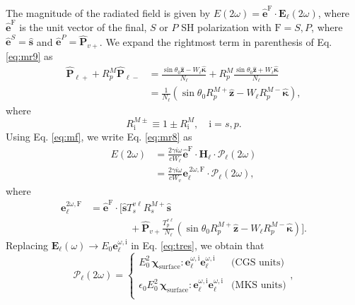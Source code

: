 \documentclass[aps,prb,10pt,showpacs,letterpaper,twocolumn]{revtex4-1}
\begin{document}
The magnitude of the radiated field is given by $E(2\omega) =
\hat{\mathbf{e}}^{\mathrm{F}}\cdot\mathbf{E}_{\ell}(2\omega)$, where
$\hat{\mathbf{e}}^{\mathrm{F}}$ is the unit vector of the final, $S$ or $P$ SH
polarization with $\mathrm{F} = S,P$, where
$\hat{\mathbf{e}}^S=\hat{\mathbf{s}}$ and
$\hat{\mathbf{e}}^P=\hat{\mathbf{P}}_{v+}$. We expand the rightmost term in
parenthesis of Eq. \eqref{eq:mr9} as
\begin{equation*}
\begin{split}
\hat{\mathbf{P}}_{\ell +} + R^{M}_{p}\hat{\mathbf{P}}_{\ell -}
&= \frac{\sin\theta_{0}\hat{\mathbf{z}} - W_{\ell}\hat{\boldsymbol{\kappa}}}
        {N_{\ell}}
 + R^{M}_{p}
   \frac{\sin\theta_{0}\hat{\mathbf{z}} + W_{\ell}\hat{\boldsymbol{\kappa}}}
        {N_{\ell}}\\
&= \frac{1}{N_{\ell}}
\left(
\sin\theta_{0}R^{M+}_{p}\hat{\mathbf{z}}
- W_{\ell}R^{M-}_{p}\hat{\boldsymbol{\kappa}}
\right),
\end{split}
\end{equation*}
where
\begin{equation}\label{eq:rm}
R^{M\pm}_{\mathrm{i}}\equiv 1 \pm R^{M}_{\mathrm{i}}, \quad \mathrm{i}=s,p.
\end{equation}
Using Eq. \eqref{eq:mf}, we write Eq. \eqref{eq:mr8} as
\begin{equation}\label{eq:r10}
\begin{split}
E(2\omega) &= \frac{2\gamma i\omega}{cW_\ell}
\hat{\mathbf{e}}^{\mathrm{F}}\cdot\mathbf{H}_{\ell}\cdot
\boldsymbol{\mathcal{P}}_{\ell}(2\omega)\\
&= \frac{2\gamma i\omega}{cW_{v}}
\mathbf{e}^{\,2\omega,\mathrm{F}}_{\ell}\cdot
\boldsymbol{\mathcal{P}}_{\ell}(2\omega),
\end{split}
\end{equation}
where
\begin{align}\label{eq:r12mm}
\mathbf{e}^{2\omega,\mathrm{F}}_{\ell} &= 
\hat{\mathbf{e}}^{\mathrm{F}}\cdot 
\Bigg[
\hat{\mathbf{s}}T_{s}^{v\ell}R^{M+}_{s}\hat{\mathbf{s}}\\
&\hspace{4em}+ \hat{\mathbf{P}}_{v+}
\frac{T^{v\ell}_{p}}
     {N_{\ell}}
\left(
\sin\theta_{0}R^{M+}_{p}\hat{\mathbf{z}}
- W_{\ell}R^{M-}_{p}\hat{\boldsymbol{\kappa}}
\right) 
\Bigg].\nonumber
\end{align}  
Replacing $\mathbf{E}_\ell(\omega)\to E_0\mathbf{e}^{\omega,\mathrm{i}}_\ell$
in Eq. \eqref{eq:tres}, we obtain that
\begin{equation}\label{eq:m4}
\boldsymbol{\mathcal{P}}_{\ell}(2\omega) = 
\left\{
\begin{array}{cc}  
E^{2}_{0}\,
\boldsymbol{\chi}_{\mathrm{surface}}:\mathbf{e}^{\omega,\mathrm{i}}_{\ell}
                  \mathbf{e}^{\omega,\mathrm{i}}_{\ell}
& \text{(CGS units)}\\\\
\epsilon_{0}E^{2}_{0}\,
\boldsymbol{\chi}_{\mathrm{surface}}:\mathbf{e}^{\omega,\mathrm{i}}_{\ell}
                  \mathbf{e}^{\omega,\mathrm{i}}_{\ell}
& \text{(MKS units)}\\
\end{array}
\right.,
\end{equation}
\end{document}
